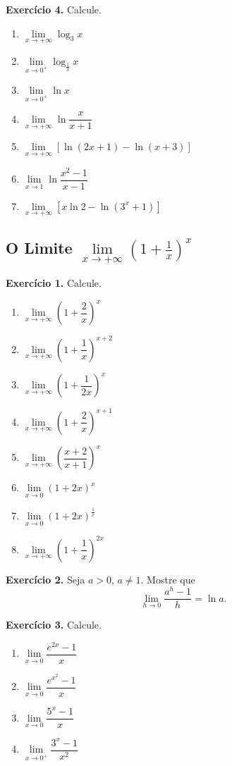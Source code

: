 \documentclass[12pt,a4paper]{article}
\begin{document}
\vspace{0.5cm}
\noindent\textbf{Exercício 4.} Calcule.
\begin{enumerate}
    \renewcommand{\theenumi}{\alph{enumi}}
    \renewcommand{\labelenumi}{\theenumi)}
    \item $\lim\limits_{x \to +\infty} \log_3 x$
    \item $\lim\limits_{x \to 0^+} \log_{\frac{1}{3}} x$
    \item $\lim\limits_{x \to 0^+} \ln x$
    \item $\lim\limits_{x \to +\infty} \ln\dfrac{x}{x + 1}$
    \item $\lim\limits_{x \to +\infty} [\ln(2x + 1) - \ln(x + 3)]$
    \item $\lim\limits_{x \to 1} \ln\dfrac{x^2 - 1}{x - 1}$
    \item $\lim\limits_{x \to +\infty} [x\ln 2 - \ln(3^x + 1)]$
\end{enumerate}

\subsection{O Limite $\lim\limits_{x \to +\infty} \left(1 + \frac{1}{x}\right)^x$}
\vspace{0.5cm}
\noindent\textbf{Exercício 1.} Calcule.
\begin{enumerate}
    \renewcommand{\theenumi}{\alph{enumi}}
    \renewcommand{\labelenumi}{\theenumi)}
    \item $\lim\limits_{x \to +\infty} \left(1 + \dfrac{2}{x}\right)^{\!x}$
    \item $\lim\limits_{x \to +\infty} \left(1 + \dfrac{1}{x}\right)^{\!x+2}$
    \item $\lim\limits_{x \to +\infty} \left(1 + \dfrac{1}{2x}\right)^{\!x}$
    \item $\lim\limits_{x \to +\infty} \left(1 + \dfrac{2}{x}\right)^{\!x+1}$
    \item $\lim\limits_{x \to +\infty} \left(\dfrac{x + 2}{x + 1}\right)^{\!x}$
    \item $\lim\limits_{x \to 0} (1 + 2x)^x$
    \item $\lim\limits_{x \to 0} (1 + 2x)^{\frac{1}{x}}$
    \item $\lim\limits_{x \to +\infty} \left(1 + \dfrac{1}{x}\right)^{\!2x}$
\end{enumerate}

\vspace{0.5cm}
\noindent\textbf{Exercício 2.} Seja $a > 0$, $a \neq 1$. Mostre que
\[
\lim_{h \to 0} \dfrac{a^h - 1}{h} = \ln a.
\]

\vspace{0.5cm}
\noindent\textbf{Exercício 3.} Calcule.
\begin{enumerate}
    \renewcommand{\theenumi}{\alph{enumi}}
    \renewcommand{\labelenumi}{\theenumi)}
    \item $\lim\limits_{x \to 0} \dfrac{e^{2x} - 1}{x}$
    \item $\lim\limits_{x \to 0} \dfrac{e^{x^2} - 1}{x}$
    \item $\lim\limits_{x \to 0} \dfrac{5^x - 1}{x}$
    \item $\lim\limits_{x \to 0^+} \dfrac{3^x - 1}{x^2}$
\end{enumerate}
\end{document}

